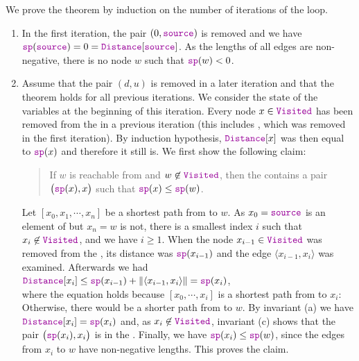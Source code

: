 We prove the theorem by induction on the number of iterations of the  loop.
\begin{enumerate}
\item[B.C.:] In the first iteration, the pair $(0, \mytt{source})$ is removed and we have
  $\mytt{sp}(\mytt{source}) = 0 = \mytt{Distance}[\mytt{source}]$.  As the lengths of all edges are
  non-negative, there is no node $w$ such that $\mytt{sp}(w) < 0$.
\item[I.S.:] Assume that the pair $(d, u)$ is removed in a later iteration and that the theorem holds for all
  previous iterations.  We consider the state of the variables at the beginning of this iteration.  Every node
  $x \in \mytt{Visited}$ has been removed from the  in a previous iteration (this includes
  , which was removed in the first iteration).  By induction hypothesis, $\mytt{Distance}[x]$ was then
  equal to $\mytt{sp}(x)$ and therefore it still is.  We first show the following claim:
  \begin{quote}
    If $w$ is reachable from  and $w \not\in \mytt{Visited}$, then the  contains a pair
    $\bigl(\mytt{sp}(x), x\bigr)$ such that $\mytt{sp}(x) \leq \mytt{sp}(w)$.
  \end{quote}
  Let $[x_0, x_1, \cdots, x_n]$ be a shortest path from  to $w$.  As $x_0 = \mytt{source}$ is an
  element of  but $x_n = w$ is not, there is a smallest index $i$ such that $x_i \not\in
  \mytt{Visited}$, and we have $i \geq 1$.  When the node $x_{i-1} \in \mytt{Visited}$ was removed from the
  , its distance was $\mytt{sp}(x_{i-1})$ and the edge $\langle x_{i-1}, x_i\rangle$ was
  examined.  Afterwards we had
  \\[0.2cm]
  \hspace*{1.3cm}
  $\mytt{Distance}[x_i] \leq \mytt{sp}(x_{i-1}) + \weight{\langle x_{i-1}, x_i \rangle} = \mytt{sp}(x_i)$,
  \\[0.2cm]
  where the equation holds because $[x_0, \cdots, x_i]$ is a shortest path from  to $x_i$: Otherwise,
  there would be a shorter path from  to $w$.  By invariant (a) we have
  $\mytt{Distance}[x_i] = \mytt{sp}(x_i)$ and, as $x_i \not\in \mytt{Visited}$, invariant (c) shows that the pair
  $\bigl(\mytt{sp}(x_i), x_i\bigr)$ is in the .  Finally, we have $\mytt{sp}(x_i) \leq \mytt{sp}(w)$,
  since the edges from $x_i$ to $w$ have non-negative lengths.  This proves the claim.


\end{enumerate}
